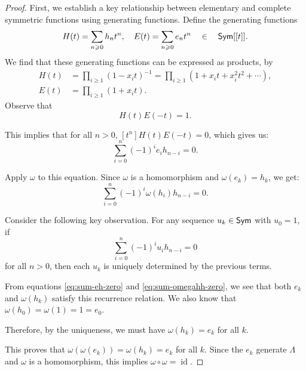 \begin{proof}
	First, we establish a key relationship between elementary and complete symmetric functions using generating functions.
	Define the generating functions
	\begin{equation}
		H(t) = \sum_{n \geqslant 0} h_n t^n, \quad
		E(t) = \sum_{n \geqslant 0} e_n t^n \quad \in \quad \operatorname{\mathsf{Sym}}[[t]].
	\end{equation}
	We find that these generating functions can be expressed as products, by
	\begin{align}
		H(t) & = \prod_{i \geq 1} (1 - x_it)^{-1} = \prod_{i \geq 1} (1 + x_it + x_i^2t^2 + \cdots), \\
		E(t) & = \prod_{i \geq 1} (1 + x_it).
	\end{align}
	Observe that
	\begin{equation}
		H(t)E(-t) = 1.
	\end{equation}

	This implies that for all \(n > 0\), \([t^n]H(t)E(-t) = 0\), which gives us:
	\begin{equation} \label{eq:sum-eh-zero}
		\sum_{i=0}^n (-1)^i e_i h_{n-i} = 0.
	\end{equation}

	Apply \(\omega\) to this equation.
	Since \(\omega\) is a homomorphism and \(\omega(e_k) = h_k\), we get:
	\begin{equation} \label{eq:sum-omegahh-zero}
		\sum_{i=0}^n (-1)^i \omega(h_i) h_{n-i} = 0.
	\end{equation}

	Consider the following key observation.
	For any sequence \(u_k \in \operatorname{\mathsf{Sym}}\) with \(u_0 = 1\), if
	\begin{equation} \label{eq:sum-uh-zero}
		\sum_{i = 0}^n (-1)^i u_i h_{n-i} = 0
	\end{equation}
	for all \(n > 0\), then each \(u_k\) is uniquely determined by the previous terms.

	From equations \eqref{eq:sum-eh-zero} and \eqref{eq:sum-omegahh-zero},
	we see that both \(e_k\) and \(\omega(h_k)\) satisfy this recurrence relation.
	We also know that \(\omega(h_0) = \omega(1) = 1 = e_0\).

	Therefore, by the uniqueness, we must have \(\omega(h_k) = e_k\) for all \(k\).

	This proves that \(\omega(\omega(e_k)) = \omega(h_k) = e_k\) for all \(k\). Since the \(e_k\) generate \(\Lambda\) and \(\omega\) is a homomorphism, this implies \(\omega \circ \omega = \operatorname{id}\).
\end{proof}

